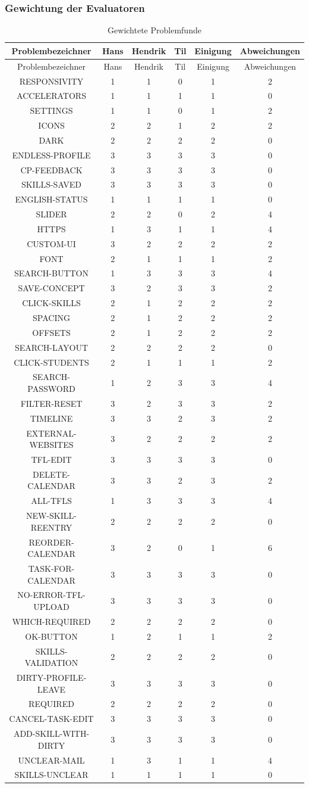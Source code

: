 \documentclass[
  12pt,
  ngerman,
  a4paper,
]{article}
\begin{document}
\hypertarget{gewichtung-der-evaluatoren}{%
\subsubsection{Gewichtung der
Evaluatoren}\label{gewichtung-der-evaluatoren}}

\begin{longtable}[]{@{}cccccc@{}}
\caption{Gewichtete Problemfunde
\label{tbl:heur:weighted}}\tabularnewline
\toprule
Problembezeichner & Hans & Hendrik & Til & Einigung &
Abweichungen\tabularnewline
\midrule
\endfirsthead
\toprule
Problembezeichner & Hans & Hendrik & Til & Einigung &
Abweichungen\tabularnewline
\midrule
\endhead
RESPONSIVITY & 1 & 1 & 0 & 1 & 2\tabularnewline
ACCELERATORS & 1 & 1 & 1 & 1 & 0\tabularnewline
SETTINGS & 1 & 1 & 0 & 1 & 2\tabularnewline
ICONS & 2 & 2 & 1 & 2 & 2\tabularnewline
DARK & 2 & 2 & 2 & 2 & 0\tabularnewline
ENDLESS-PROFILE & 3 & 3 & 3 & 3 & 0\tabularnewline
CP-FEEDBACK & 3 & 3 & 3 & 3 & 0\tabularnewline
SKILLS-SAVED & 3 & 3 & 3 & 3 & 0\tabularnewline
ENGLISH-STATUS & 1 & 1 & 1 & 1 & 0\tabularnewline
SLIDER & 2 & 2 & 0 & 2 & 4\tabularnewline
HTTPS & 1 & 3 & 1 & 1 & 4\tabularnewline
CUSTOM-UI & 3 & 2 & 2 & 2 & 2\tabularnewline
FONT & 2 & 1 & 1 & 1 & 2\tabularnewline
SEARCH-BUTTON & 1 & 3 & 3 & 3 & 4\tabularnewline
SAVE-CONCEPT & 3 & 2 & 3 & 3 & 2\tabularnewline
CLICK-SKILLS & 2 & 1 & 2 & 2 & 2\tabularnewline
SPACING & 2 & 1 & 2 & 2 & 2\tabularnewline
OFFSETS & 2 & 1 & 2 & 2 & 2\tabularnewline
SEARCH-LAYOUT & 2 & 2 & 2 & 2 & 0\tabularnewline
CLICK-STUDENTS & 2 & 1 & 1 & 1 & 2\tabularnewline
SEARCH-PASSWORD & 1 & 2 & 3 & 3 & 4\tabularnewline
FILTER-RESET & 3 & 2 & 3 & 3 & 2\tabularnewline
TIMELINE & 3 & 3 & 2 & 3 & 2\tabularnewline
EXTERNAL-WEBSITES & 3 & 2 & 2 & 2 & 2\tabularnewline
TFL-EDIT & 3 & 3 & 3 & 3 & 0\tabularnewline
DELETE-CALENDAR & 3 & 3 & 2 & 3 & 2\tabularnewline
ALL-TFLS & 1 & 3 & 3 & 3 & 4\tabularnewline
NEW-SKILL-REENTRY & 2 & 2 & 2 & 2 & 0\tabularnewline
REORDER-CALENDAR & 3 & 2 & 0 & 1 & 6\tabularnewline
TASK-FOR-CALENDAR & 3 & 3 & 3 & 3 & 0\tabularnewline
NO-ERROR-TFL-UPLOAD & 3 & 3 & 3 & 3 & 0\tabularnewline
WHICH-REQUIRED & 2 & 2 & 2 & 2 & 0\tabularnewline
OK-BUTTON & 1 & 2 & 1 & 1 & 2\tabularnewline
SKILLS-VALIDATION & 2 & 2 & 2 & 2 & 0\tabularnewline
DIRTY-PROFILE-LEAVE & 3 & 3 & 3 & 3 & 0\tabularnewline
REQUIRED & 2 & 2 & 2 & 2 & 0\tabularnewline
CANCEL-TASK-EDIT & 3 & 3 & 3 & 3 & 0\tabularnewline
ADD-SKILL-WITH-DIRTY & 3 & 3 & 3 & 3 & 0\tabularnewline
UNCLEAR-MAIL & 1 & 3 & 1 & 1 & 4\tabularnewline
SKILLS-UNCLEAR & 1 & 1 & 1 & 1 & 0\tabularnewline

\end{longtable}
\end{document}
